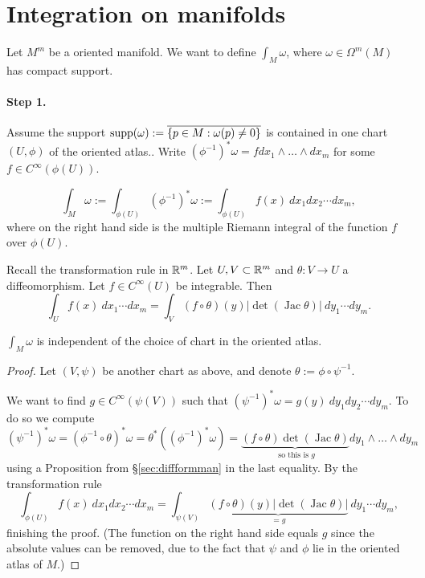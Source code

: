 \section{Integration on manifolds}
 

Let $M^{m}$ be a oriented manifold.
We want to define $\int_M \omega$, where $\omega \in  \Omega^{m}(M)$ has compact support.

\paragraph{Step 1.}
Assume  the support  $\operatorname{supp}(\omega):=\overline{\{p\in M: \omega(p)\neq 0\}}$ is contained in one chart $(U,\phi)$ of the oriented atlas..
Write $(\phi^{-1})^{*} \omega = f dx_1 \wedge \ldots \wedge dx_m$ for some $f \in C^{\infty}(\phi(U))$.
\begin{definition}
    \[
        \int_M \omega := \int_{\phi(U)} (\phi^{-1})^{*} \omega := \int_{\phi(U)} f(x) \: dx_1 dx_2 \cdots dx_m,\]
where on the right hand side is the multiple Riemann integral of the function $f$ over $\phi(U)$.         
\end{definition}

Recall the transformation rule in $\mathbb{R}^{m}$.
Let $U, V \subset \mathbb{R}^m$ and $\theta: V \to  U$ a diffeomorphism.
Let $f \in C^{\infty}(U)$ be integrable.
Then
\[
    \int_U f(x) \: dx_1 \cdots dx_m = \int_V (f  \circ  \theta)(y) | \det (\operatorname{Jac} \theta)| \: dy_1 \cdots dy_m
.\] 

 
\begin{lemma}
    $\int_M \omega$ is independent of the choice of chart in the oriented atlas.
\end{lemma}
\begin{proof}
  Let $(V,\psi)$ be another chart as above, and denote $\theta:=\phi \circ \psi^{-1}$.
  \begin{figure}[H]
    \centering
    \label{tangent-vector-definition-chart-independent-ForDiffForms}
\end{figure}
We want to find $g\in C^{\infty}(\psi(V))$ such that $(\psi^{-1})^*\omega=
  g(y) \: dy_1 dy_2 \cdots dy_m$. To do so we compute
$$
  (\psi^{-1})^*\omega=(\phi^{-1}\circ \theta)^*\omega= \theta^*((\phi^{-1})^*\omega)=
 \underbrace{(f  \circ  \theta) \det (\operatorname{Jac} \theta)}_{\text{ so this is $g$}}  dy_1 \wedge \ldots \wedge dy_m
$$
using a Proposition from \S\ref{sec:diffformman} in the last equality.
By the transformation rule $$\int_{\phi(U)} f(x) \: dx_1 dx_2 \cdots dx_m=
 \int_{\psi(V)} \underbrace{(f  \circ  \theta)(y) | \det (\operatorname{Jac} \theta)|}_{=g} \: dy_1 \cdots dy_m,$$
 finishing the proof.
(The function on the right hand side equals $g$ since 
the absolute values  can be removed, due to the fact that $\psi$ and $\phi$ lie in the oriented atlas of $M$.)
\end{proof}


